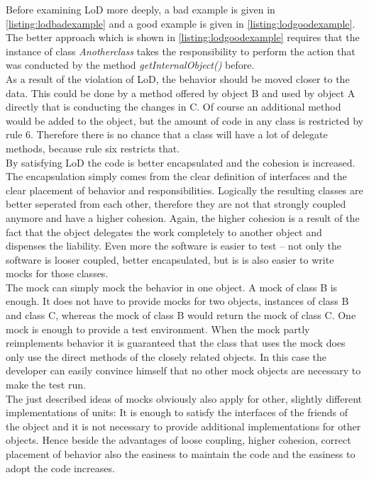 Before examining \ac{LoD} more deeply, a bad example is given in \ref{listing:lodbadexample} and a good example is given in \ref{listing:lodgoodexample}. The better approach which is shown in \ref{listing:lodgoodexample} requires that the instance of class \textit{Anotherclass} takes the responsibility to perform the action that was conducted by the method \textit{getInternalObject()} before.
\\

As a result of the violation of \ac{LoD}, the behavior should be moved closer to the data. This could be done by a method offered by object B and used by object A directly that is conducting the changes in C. Of course an additional method would be added to the object, but the amount of code in any class is restricted by rule 6. Therefore there is no chance that a class will have a lot of delegate methods, because rule six restricts that. 
\\

By satisfying \ac{LoD} the code is better encapsulated and the cohesion is increased. The encapsulation simply comes from the clear definition of interfaces and the clear placement of behavior and responsibilities. Logically the resulting classes are better seperated from each other, therefore they are not that strongly coupled anymore and have a higher cohesion. Again, the higher cohesion is a result of the fact that the object delegates the work completely to another object and dispenses the liability. Even more the software is easier to test -- not only the software is looser coupled, better encapsulated, but is is also easier to write mocks for those classes.
\\

The mock can simply mock the behavior in one object. A mock of class B is enough. It does not have to provide mocks for two objects, instances of class B and class C, whereas the mock of class B would return the mock of class C. One mock is enough to provide a test environment. When the mock partly reimplements behavior it is guaranteed that the class that uses the mock does only use the direct methods of the closely related objects. In this case the developer can easily convince himself that no other mock objects are necessary to make the test run.
\\

The just described ideas of mocks obviously also apply for other, slightly different implementations of units: It is enough to satisfy the interfaces of the friends of the object and it is not necessary to provide additional implementations for other objects. Hence beside the advantages of loose coupling, higher cohesion, correct placement of behavior also the easiness to maintain the code and the easiness to adopt the code increases. 
\\

